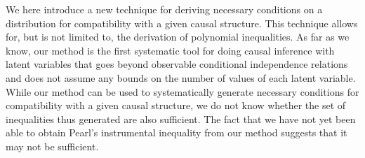 

We here introduce a new technique for deriving necessary conditions on a distribution for compatibility with a given causal structure. 
This technique allows for, but is not limited to, the derivation of polynomial inequalities. As far as we know, our method is the first systematic tool for doing causal inference with latent variables that goes beyond observable conditional independence relations and does not assume any bounds on the number of values of each latent variable. While our method can be used to systematically generate necessary conditions for compatibility with a given causal structure, we do not know whether the set of inequalities thus generated are also sufficient.  
The fact that we have not yet been able to obtain Pearl's instrumental inequality from our method suggests that it may not be sufficient.

